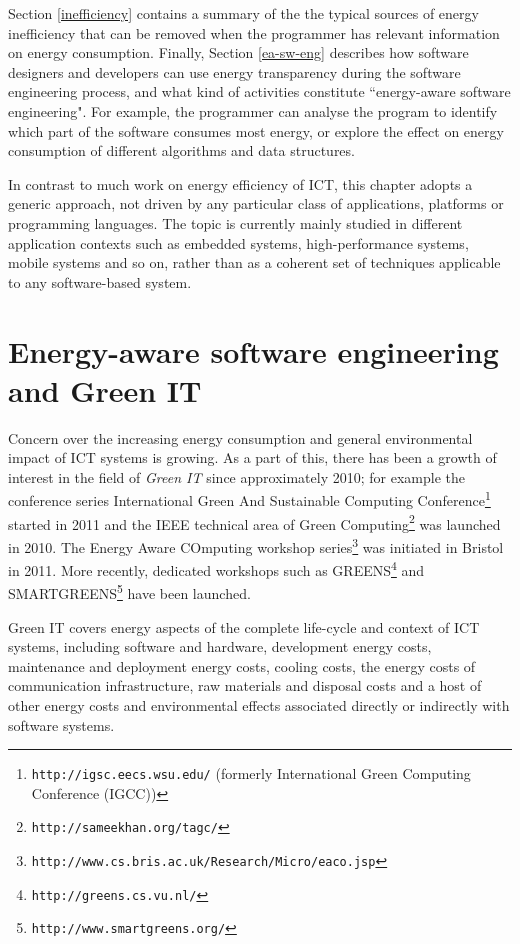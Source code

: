 \documentclass[oneside]{book}
\begin{document}
Section \ref{inefficiency} contains a summary of the the typical sources of energy inefficiency that can be removed when the programmer has relevant information on energy consumption.   Finally, Section \ref{ea-sw-eng} describes how software designers and developers can use energy transparency during the software engineering process, and what kind of activities constitute ``energy-aware software engineering".  For example, the programmer can analyse the program to identify which part of the software consumes most energy, or explore the effect on
energy consumption of different algorithms and data structures.

In contrast to much work on energy efficiency of ICT, this chapter adopts a generic approach, not driven by any particular class of applications, platforms or programming languages. The topic is currently mainly studied in different application contexts such as embedded systems, high-performance systems, mobile systems and so on, rather than as a coherent set of techniques applicable to any software-based system.

\nopagebreak
\section{Energy-aware software engineering and Green IT}
\label{greenit}
Concern over the increasing energy consumption and general environmental impact of ICT systems is growing.  As a part of this,
there has been a growth of interest in the field of \emph{Green IT}  \cite{KrauseCraigWood2010,DBLP:journals/stt/NaumannKD13,DBLP:journals/infsof/CapraFS12,DBLP:journals/stt/NaumannKD13,Mahmoud_Ahmad_2013} since approximately 2010; for example the conference series International Green And Sustainable Computing Conference\footnote{\texttt{http://igsc.eecs.wsu.edu/} (formerly International Green Computing Conference (IGCC))} started in 2011 and the IEEE technical area of Green Computing\footnote{\texttt{http://sameekhan.org/tagc/}} was launched in 2010.  The Energy Aware COmputing workshop series\footnote{\texttt{http://www.cs.bris.ac.uk/Research/Micro/eaco.jsp}} was initiated in Bristol in 2011.
More recently, dedicated workshops such as GREENS\footnote{\texttt{http://greens.cs.vu.nl/}} and SMARTGREENS\footnote{\texttt{http://www.smartgreens.org/}} have been launched. 

Green IT covers energy aspects of the complete life-cycle and context of ICT systems, including software and hardware, development energy costs, maintenance and deployment energy costs, cooling costs, the energy costs of communication infrastructure, raw materials and disposal costs and a host of other energy costs and environmental effects associated directly or indirectly with software systems. 
\end{document}

